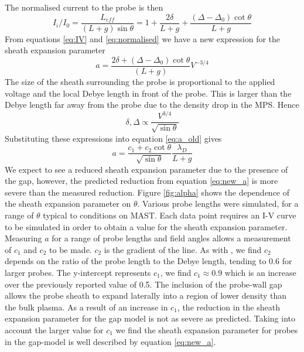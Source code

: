  
The normalised current to the probe is then 
\begin{equation}
I_i/I_0 = \frac{L_{eff}}{(L+g)\sin{\theta}} = 1 +  \frac{2 \delta}{L+g} + \frac{(\Delta-\Delta_0)\cot{\theta}}{L+g}
\label{eq:normalised}
\end{equation}
From equations \ref{eq:IV} and \ref{eq:normalised} we have a new expression for the sheath expansion parameter 
\begin{equation}
a = \frac{2\delta + (\Delta-\Delta_0)\cot{\theta}}{(L+g)}V^{-3/4}
\label{eq:a_old}
\end{equation}
The size of the sheath surrounding the probe is proportional to the applied voltage and the local Debye length in front of the probe. This is larger than the Debye length far away from the probe due to the density drop in the MPS. Hence
\begin{equation}
\delta,\Delta \propto \frac{V^{3/4}}{\sqrt{\sin{\theta}}}
\end{equation}
Substituting these expressions into equation \ref{eq:a_old} gives 
\begin{equation}
a = \frac{c_1+c_2 \cot{\theta}}{\sqrt{\sin{\theta}}}\frac{\lambda_D}{L+g}
\label{eq:new_a}
\end{equation}
We expect to see a reduced sheath expansion parameter due to the presence of the gap, however, the predicted reduction from equation \ref{eq:new_a} is more severe than the measured reduction. Figure \ref{fig:alpha} shows the dependence of the sheath expansion parameter on $\theta$. Various probe lengths were simulated, for a range of $\theta$ typical to conditions on MAST. Each data point requires an I-V curve to be simulated in order to obtain a value for the sheath expansion parameter. Measuring $a$ for a range of probe lengths and field angles allows a measurement of $c_1$ and $c_2$ to be made. $c_2$ is the gradient of the line. As with \cite{Bergmann-2002}, we find $c_2$ depends on the ratio of the probe length to the Debye length, tending to 0.6 for larger probes. The y-intercept represents $c_1$, we find $c_1 \approx 0.9$ which is an increase over the previously reported value of 0.5. The inclusion of the probe-wall gap allows the probe sheath to expand laterally into a region of lower density than the bulk plasma. As a result of an increase in $c_1$, the reduction in the sheath expansion parameter for the gap model is not as severe as predicted. Taking into account the larger value for $c_1$ we find the sheath expansion parameter for probes in the gap-model is well described by equation \ref{eq:new_a}.

